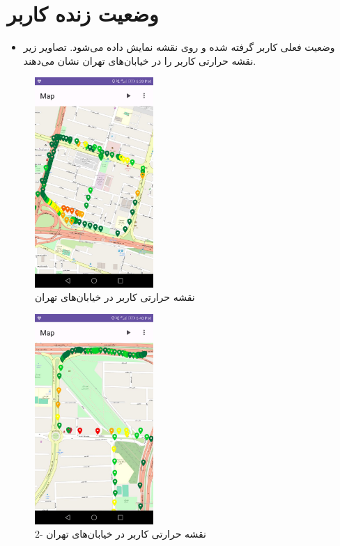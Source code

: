 \documentclass[oneside]{report}
\begin{document}
\section{وضعیت زنده کاربر}
\begin{itemize}
      \item وضعیت فعلی کاربر گرفته شده و روی نقشه نمایش داده می‌شود. تصاویر زیر نقشه حرارتی کاربر را در خیابان‌های تهران نشان می‌دهند.
\end{itemize}
\begin{center}
      \begin{figure}[H]
            \centering
            \includegraphics[width=0.4\textwidth]{../images/map1.jpg}
            \caption{نقشه حرارتی کاربر در خیابان‌های تهران}
      \end{figure}
      \begin{figure}[H]
            \centering
            \includegraphics[width=0.4\textwidth]{../images/map2.jpg}
            \caption{نقشه حرارتی کاربر در خیابان‌های تهران -2}
      \end{figure}
\end{center}
\end{document}
